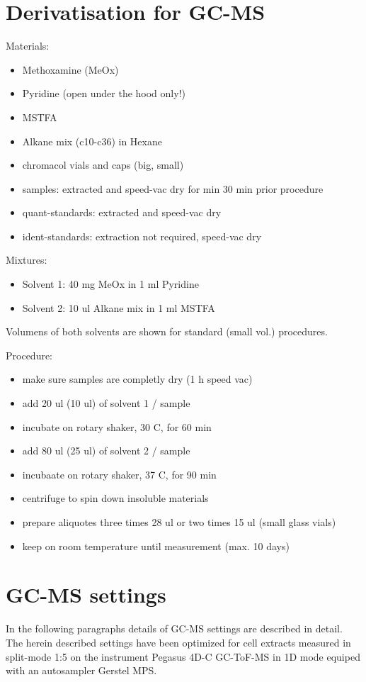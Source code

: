 \documentclass[]{book}
\providecommand{\tightlist}{%
  \setlength{\itemsep}{0pt}\setlength{\parskip}{0pt}}
\theoremstyle{definition}
\theoremstyle{definition}
\theoremstyle{definition}
\theoremstyle{remark}
\begin{document}
\section{Derivatisation for GC-MS}\label{Deriv}

Materials:

\begin{itemize}
\tightlist
\item
  Methoxamine (MeOx)
\item
  Pyridine (open under the hood only!)
\item
  MSTFA
\item
  Alkane mix (c10-c36) in Hexane
\item
  chromacol vials and caps (big, small)
\item
  samples: extracted and speed-vac dry for min 30 min prior procedure
\item
  quant-standards: extracted and speed-vac dry
\item
  ident-standards: extraction not required, speed-vac dry
\end{itemize}

Mixtures:

\begin{itemize}
\tightlist
\item
  Solvent 1: 40 mg MeOx in 1 ml Pyridine
\item
  Solvent 2: 10 ul Alkane mix in 1 ml MSTFA
\end{itemize}

Volumens of both solvents are shown for standard (small vol.)
procedures.

Procedure:

\begin{itemize}
\tightlist
\item
  make sure samples are completly dry (1 h speed vac)
\item
  add 20 ul (10 ul) of solvent 1 / sample
\item
  incubate on rotary shaker, 30 C, for 60 min
\item
  add 80 ul (25 ul) of solvent 2 / sample
\item
  incubaate on rotary shaker, 37 C, for 90 min
\item
  centrifuge to spin down insoluble materials
\item
  prepare aliquotes three times 28 ul or two times 15 ul (small glass
  vials)
\item
  keep on room temperature until measurement (max. 10 days)
\end{itemize}

\section{GC-MS settings}\label{gcms}

In the following paragraphs details of GC-MS settings are described in
detail. The herein described settings have been optimized for cell
extracts measured in split-mode 1:5 on the instrument Pegasus 4D-C
GC-ToF-MS in 1D mode equiped with an autosampler Gerstel MPS.


\end{document}

